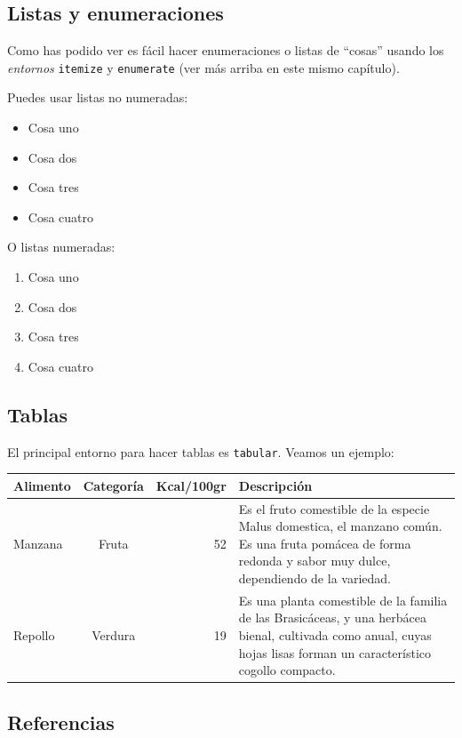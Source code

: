 \subsection{Listas y enumeraciones}

Como has podido ver es fácil hacer enumeraciones o listas de ``cosas''
usando los \emph{entornos} \verb|itemize| y \verb|enumerate| (ver
más arriba en este mismo capítulo).

Puedes usar listas no numeradas:
\begin{itemize}
\item Cosa uno
\item Cosa dos
\item Cosa tres
\item Cosa cuatro
\end{itemize}

O listas numeradas:
\begin{enumerate}
\item Cosa uno
\item Cosa dos
\item Cosa tres
\item Cosa cuatro
\end{enumerate}


\subsection{Tablas}
El principal entorno para hacer tablas es \verb!tabular!. Veamos un ejemplo:

\begin{tabular}{||l|c|r|p{15em}|}
  \hline
  \hline
  \textbf{Alimento} & \textbf{Categoría} & \textbf{Kcal/100gr} & \textbf{Descripción}\\
  \hline
  \hline
  Manzana & Fruta & 52 & Es el fruto comestible de la especie Malus domestica, el manzano común. Es una fruta pomácea de forma redonda y sabor muy dulce, dependiendo de la variedad.\\
  \hline
  Repollo & Verdura & 19 & Es una planta comestible de la familia de las Brasicáceas, y una herbácea bienal, cultivada como anual, cuyas hojas lisas forman un característico cogollo compacto.\\
  \hline
  \hline
  \hline
\end{tabular}


\subsection{Referencias}

